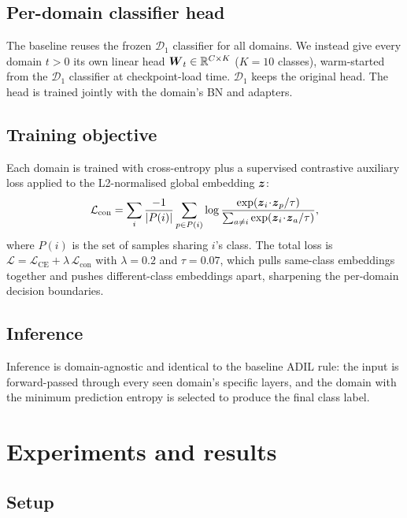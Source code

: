 \documentclass{article}
\newcommand{\symvec}[1]{{\mbox{\boldmath $#1$}}}
\begin{document}
\begin{sloppy}
\subsection{Per-domain classifier head}
\label{ssec:head}

The baseline reuses the frozen $\mathcal{D}_1$ classifier for all domains.
We instead give every domain $t>0$ its own linear head
$\symvec{W}_t\in\mathbb{R}^{C\times K}$ ($K=10$ classes), warm-started from
the $\mathcal{D}_1$ classifier at checkpoint-load time. $\mathcal{D}_1$ keeps
the original head. The head is trained jointly with the domain's BN and
adapters.

\subsection{Training objective}
\label{ssec:loss}

Each domain is trained with cross-entropy plus a supervised contrastive
auxiliary loss \cite{khosla2020supcon} applied to the L2-normalised global
embedding $\symvec{z}$:
\begin{equation}
  \label{eqn:supcon}
  \mathcal{L}_{\mathrm{con}} =
    \sum_{i}\frac{-1}{|P(i)|}\sum_{p\in P(i)}
      \log\frac{\exp(\symvec{z}_i\!\cdot\!\symvec{z}_p/\tau)}
               {\sum_{a\neq i}\exp(\symvec{z}_i\!\cdot\!\symvec{z}_a/\tau)},
\end{equation}
where $P(i)$ is the set of samples sharing $i$'s class. The total loss is
$\mathcal{L} = \mathcal{L}_{\mathrm{CE}} +
\lambda\,\mathcal{L}_{\mathrm{con}}$ with $\lambda=0.2$ and $\tau=0.07$,
which pulls same-class embeddings together and pushes different-class
embeddings apart, sharpening the per-domain decision boundaries.

\subsection{Inference}
\label{ssec:inference}

Inference is domain-agnostic and identical to the baseline ADIL rule: the
input is forward-passed through every seen domain's specific layers, and the
domain with the minimum prediction entropy is selected to produce the final
class label.


\section{Experiments and results}
\label{sec:results}

\subsection{Setup}
\label{ssec:setup}


\end{sloppy}
\end{document}
